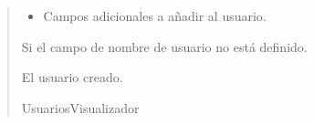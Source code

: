\documentclass[letterpaper,10pt,spanish]{sphinxmanual}
\begin{document}
\begin{fulllineitems}
\begin{fulllineitems}
\begin{quote}
\begin{description}
\begin{itemize}
\item {} 
\sphinxAtStartPar
{} \textendash{} Campos adicionales a añadir al usuario.

\end{itemize}

\sphinxAtStartPar
{} \textendash{} Si el campo de nombre de usuario no está definido.

\sphinxAtStartPar
El usuario creado.

\sphinxAtStartPar
UsuariosVisualizador

\end{description}\end{quote}

\end{fulllineitems}


\end{fulllineitems}
\end{document}
